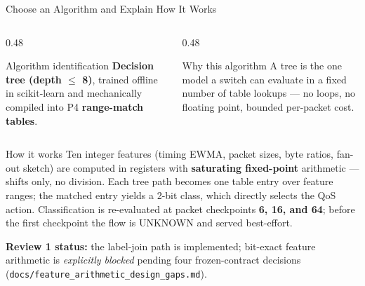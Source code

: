 \documentclass[aspectratio=169,11pt]{beamer}
\begin{document}
\begin{frame}{Choose an Algorithm and Explain How It Works}
  \begin{columns}[T, onlytextwidth]
    \begin{column}{0.48\textwidth}
      \begin{block}{Algorithm identification}
        \small \textbf{Decision tree (depth $\leq$ 8)}, trained offline in scikit-learn and
        mechanically compiled into P4 \textbf{range-match tables}.
      \end{block}
    \end{column}
    \begin{column}{0.48\textwidth}
      \begin{exampleblock}{Why this algorithm}
        \small A tree is the one model a switch can evaluate in a fixed number of table lookups ---
        no loops, no floating point, bounded per-packet cost.
      \end{exampleblock}
    \end{column}
  \end{columns}
  \begin{alertblock}{How it works}
    \small
    Ten integer features (timing EWMA, packet sizes, byte ratios, fan-out sketch) are computed in
    registers with \textbf{saturating fixed-point} arithmetic --- shifts only, no division.
    Each tree path becomes one table entry over feature ranges; the matched entry yields a 2-bit
    class, which directly selects the QoS action. Classification is re-evaluated at packet
    checkpoints \textbf{6, 16, and 64}; before the first checkpoint the flow is UNKNOWN and served
    best-effort.
  \end{alertblock}
  \vspace{-0.2em}
  {\scriptsize \textbf{Review 1 status:} the label-join path is implemented; bit-exact feature
  arithmetic is \emph{explicitly blocked} pending four frozen-contract decisions
  (\texttt{docs/feature\_arithmetic\_design\_gaps.md}).}
\end{frame}
\end{document}
